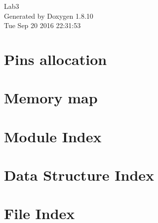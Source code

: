 \documentclass[twoside]{book}
\newcommand{\+}{\discretionary{\mbox{\scriptsize$\hookleftarrow$}}{}{}}
\newcommand{\clearemptydoublepage}{%
  \newpage{\pagestyle{empty}\cleardoublepage}%
}
\begin{document}
\hypersetup{pageanchor=false,
             bookmarks=true,
             bookmarksnumbered=true,
             pdfencoding=unicode
            }
\begin{titlepage}
\vspace*{7cm}
\begin{center}%
{\Large Lab3 }\\
\vspace*{1cm}
{\large Generated by Doxygen 1.8.10}\\
\vspace*{0.5cm}
{\small Tue Sep 20 2016 22:31:53}\\
\end{center}
\end{titlepage}
\clearemptydoublepage
\tableofcontents
\clearemptydoublepage
{}
\hypersetup{pageanchor=true}

\chapter{Pins allocation}
\label{page_pinalloc}
\hypertarget{page_pinalloc}{}

\chapter{Memory map}
\label{page_memorymap}
\hypertarget{page_memorymap}{}

\chapter{Module Index}

\chapter{Data Structure Index}

\chapter{File Index}

\end{document}
